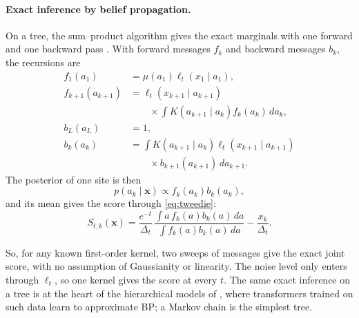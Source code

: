 \paragraph{Exact inference by belief propagation.}
On a tree, the sum--product algorithm gives the exact marginals with one forward and one backward pass
\cite{pearl1988probabilistic,kschischang2001factor,yedidia2003understanding}. With forward messages $f_k$ and backward
messages $b_k$, the recursions are
\begin{align}
    f_1(a_1)
    &=\mu(a_1)\ell_t(x_1\mid a_1),\nonumber\\
    f_{k+1}(a_{k+1})
    &=\ell_t(x_{k+1}\mid a_{k+1})\nonumber\\
    &\qquad\times\int K(a_{k+1}\mid a_k)f_k(a_k)\,da_k,\nonumber\\
    b_L(a_L)&=1,\nonumber\\
    b_k(a_k)
    &=\int K(a_{k+1}\mid a_k)
      \ell_t(x_{k+1}\mid a_{k+1})\nonumber\\
    &\qquad\times b_{k+1}(a_{k+1})\,da_{k+1}.
    \label{eq:bp}
\end{align}
The posterior of one site is then
\begin{equation}
    p(a_k\mid\mathbf x)
    \propto f_k(a_k)b_k(a_k),
\end{equation}
and its mean gives the score through \cref{eq:tweedie}:
\begin{equation}
    S_{t,k}(\mathbf x)=\frac{e^{-t}}{\Delta_t}\,
    \frac{\int a\,f_k(a)b_k(a)\,da}{\int f_k(a)b_k(a)\,da}-\frac{x_k}{\Delta_t}.
\end{equation}

So, for any known first-order kernel, two sweeps of messages give the exact joint score, with no assumption of
Gaussianity or linearity. The noise level only enters through $\ell_t$, so one kernel gives the score at every $t$.
The same exact inference on a tree is at the heart of the hierarchical models of \cite{garnierbrun2024transformers},
where transformers trained on such data learn to approximate BP; a Markov chain is the simplest tree.

